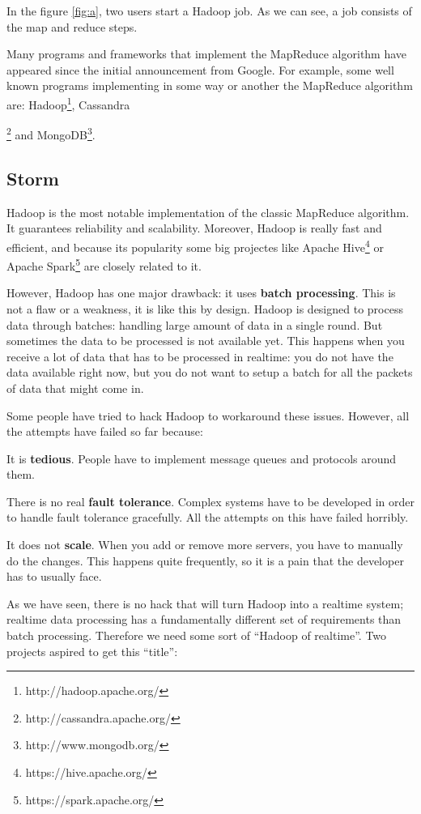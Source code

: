 In the figure \ref{fig:a}, two users start a Hadoop job. As we can see, a job
consists of the map and reduce steps.

Many programs and frameworks that implement the MapReduce algorithm have
appeared since the initial announcement from Google. For example, some
well known programs implementing in some way or another the MapReduce algorithm
are: Hadoop\footnote{http://hadoop.apache.org/},
Cassandra{\footnote{http://cassandra.apache.org/} and
MongoDB\footnote{http://www.mongodb.org/}.

\subsection{Storm}
\label{sec:state_storm}

Hadoop is the most notable implementation of the classic MapReduce algorithm. It
guarantees reliability and scalability. Moreover, Hadoop is really fast and
efficient, and because its popularity some big projectes like Apache
Hive\footnote{https://hive.apache.org/} or Apache
Spark\footnote{https://spark.apache.org/} are closely related to it.

However, Hadoop has one major drawback: it uses {\bf batch processing}. This is
not a flaw or a weakness, it is like this by design. Hadoop is designed to
process data through batches: handling large amount of data in a single round.
But sometimes the data to be processed is not available yet. This happens when
you receive a lot of data that has to be processed in realtime: you do not have
the data available right now, but you do not want to setup a batch for all the
packets of data that might come in.

Some people have tried to hack Hadoop to workaround these issues. However, all
the attempts have failed so far because:

\mylist
  \item It is {\bf tedious}. People have to implement message queues and
protocols around them.
  \item There is no real {\bf fault tolerance}. Complex systems have to be
developed in order to handle fault tolerance gracefully. All the attempts on
this have failed horribly.
  \item It does not {\bf scale}. When you add or remove more servers, you have
to manually do the changes. This happens quite frequently, so it is a pain that
the developer has to usually face.
\mylistend

As we have seen, there is no hack that will turn Hadoop into a
realtime system; realtime data processing has a fundamentally different set of
requirements than batch processing. Therefore we need some sort of ``Hadoop of
realtime''. Two projects aspired to get this ``title'':

}
